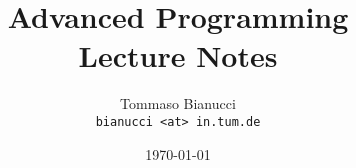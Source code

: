 
\graphicspath{ {Figures/} }

\title{Advanced Programming\\Lecture Notes}
\author{Tommaso Bianucci\\\small{\texttt{bianucci <at> in.tum.de}}}
\date{\today}


\maketitle
\tableofcontents
 


% 
% 
% 


